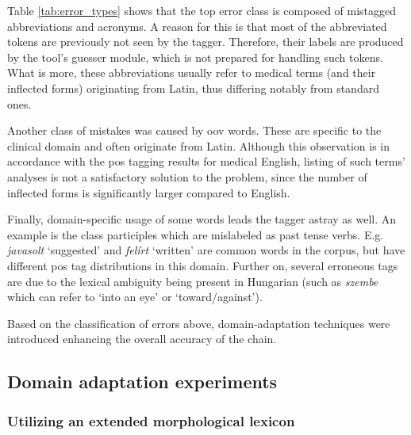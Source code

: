 Table \ref{tab:error_types} shows that the top error class is composed of mistagged abbreviations and acronyms. 
A reason for this is that most of the abbreviated tokens are previously not seen by the tagger.
Therefore, their labels are produced by the tool's guesser module, which is not prepared for handling such tokens. 
What is more, these abbreviations usually refer to medical terms (and their inflected forms) originating from Latin, thus differing notably from standard ones.

Another class of mistakes was caused by \acrlong{oov} words. 
These are specific to the clinical domain and often originate from Latin.
Although this observation is in accordance with the \acrshort{pos} tagging results for medical English, listing of such terms' analyses is not a satisfactory solution to the problem, since the number of inflected forms is significantly larger compared to English. 

Finally, domain-specific usage of some words leads the tagger astray as well. 
An example is the class participles which are mislabeled as past tense verbs. 
E.g. \textit{javasolt} `suggested’  and  \textit{felírt} `written’ are common words in the corpus, but have different \acrshort{pos} tag distributions in this domain. 
Further on, several erroneous tags are due to the lexical ambiguity being present in Hungarian (such as \textit{szembe} which can refer to `into an eye’ or `toward/against’). 

Based on the classification of errors above, domain-adaptation techniques were introduced enhancing the overall accuracy of the chain.

\subsection{Domain adaptation experiments}


\subsubsection{Utilizing an extended morphological lexicon}
\label{sec:ma-extension}


